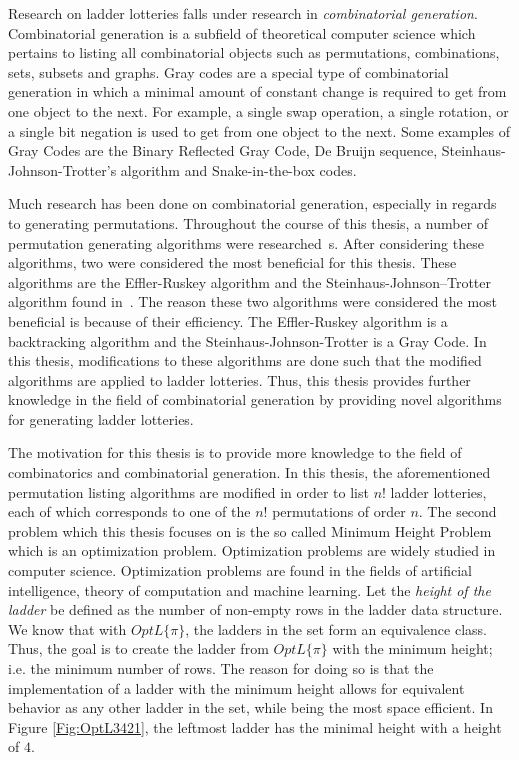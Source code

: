 Research on ladder lotteries falls under research in \emph{combinatorial generation}. Combinatorial 
generation is a subfield of theoretical computer science which pertains to listing 
all combinatorial objects such as permutations, combinations, sets, subsets and graphs. Gray codes are a 
special type of combinatorial generation in which a minimal amount of constant change 
is required to get from one object to the next. For example, a single swap operation,
a single rotation, or a single bit negation is used to get from one object to the next. Some examples of Gray Codes 
are the Binary Reflected Gray Code, De Bruijn sequence, Steinhaus-Johnson-Trotter's algorithm and 
Snake-in-the-box codes.\par 
Much research has been done on combinatorial generation, especially 
in regards to generating permutations. Throughout the course of this thesis,
a number of permutation generating algorithms were researched~\cite{A18}\cite{A19}\cite{A21}\cite{A24}\cite{A25}\cite{A26}\cite{A31}\cite{A34}\cite{A35}s.
After considering these algorithms, two were considered the most beneficial for this thesis. 
These algorithms are the Effler-Ruskey algorithm and the Steinhaus-Johnson–Trotter algorithm found in~\cite{A26}\cite{A25}.
The reason these two algorithms were considered the most beneficial is because of 
their efficiency. The Effler-Ruskey algorithm is a backtracking algorithm and the Steinhaus-Johnson-Trotter 
is a Gray Code. In this thesis, modifications to these algorithms are done such that the 
modified algorithms are applied to ladder lotteries. Thus, this thesis provides further knowledge 
in the field of combinatorial generation by providing novel algorithms for generating ladder lotteries.\par 
The motivation for this thesis is to provide more knowledge to the field of combinatorics and combinatorial 
generation. In this thesis, the aforementioned permutation listing algorithms are modified in order to 
list $n!$ ladder lotteries, each of which corresponds to one of the $n!$ permutations of order $n$.
The second problem which this thesis focuses on is the so called Minimum Height Problem which is an optimization 
problem. Optimization problems are widely studied in computer science. Optimization problems are found in 
the fields of artificial intelligence, theory of computation and machine learning. Let the 
\emph{height of the ladder} be defined as the number of non-empty rows in the ladder data structure. We know 
that with $OptL\{\pi\}$, the ladders in the set form an equivalence class. Thus, the goal is to create 
the ladder from $OptL\{\pi\}$ with the minimum height; i.e. the minimum number of rows. The reason 
for doing so is that the implementation of a ladder with the minimum height allows for equivalent behavior 
as any other ladder in the set, while being the most space efficient. In Figure \ref{Fig:OptL3421}, the leftmost 
ladder has the minimal height with a height of $4$.



